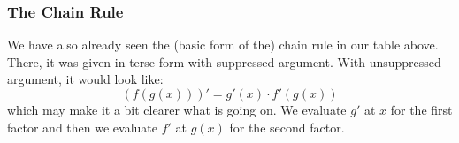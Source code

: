 \begin{comment}
which translates to:

(f' / g - f* g')  / g^2
f'' / g  -  2 * f' * g' / g^2  +  2*f * (g')^2 / g^3  -  f * g'' / g^2

The 1st is the general quotient rule. simplifying the 2nd gives:

f'' / g  -  2 * f' * g' / g^2  -  f * g'' / g^2  +   2*f * (g')^2 / g^3 
f'' / g  -  (2 f' g' - f  g'') / g^2  +   2 f (g')^2 / g^3 
(1/g) * (f'' - (2 f' g' - f  g'') / g  +  2 f (g')^2 / g^2)

Verify this formula with examples symbolically and numerically! Verify also, if it is the correct 
result when sepcializing the general formula for the n=2 case.







How Not to Repeatedly Differentiate a Reciprocal
https://www.jstor.org/stable/2324425

Is there a genralization for quotients of mupltiple functions - but what would that even mean? maybe a continued fraction expression?

ToDo:
 -Give explicit formulas for 2nd and 3rd derivative

\end{comment}



\subsubsection{The Chain Rule}
We have also already seen the (basic form of the) chain rule in our table above. There, it was given in terse form with suppressed argument. With unsuppressed argument, it would look like:
\begin{equation}
 (f( g(x)))' = g'(x) \cdot f'(g(x))
\end{equation}
which may make it a bit clearer what is going on. We evaluate $g'$ at $x$ for the first factor and then we evaluate $f'$ at $g(x)$ for the second factor.

